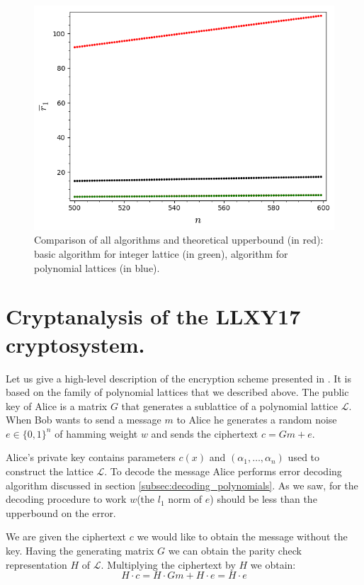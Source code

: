 \documentclass[12pt]{article}
\newcommand{\LL}{\mathcal{L}}
\begin{document}
\begin{figure}
  \includegraphics[width=\linewidth]{plot5.png}
  \caption{Comparison of all algorithms and theoretical upperbound (in red): basic algorithm for integer lattice (in green), algorithm for polynomial lattices (in blue).}
  \label{fig:everything}
\end{figure}

\section{Cryptanalysis of the LLXY17 cryptosystem.}
\label{sec:cryptanalysis}

Let us give a high-level description of the encryption scheme presented in \cite{[LLXY17]}. It is based on the family of polynomial lattices that we described above. The public key of Alice is a matrix $G$ that generates a sublattice of a polynomial lattice $\LL$. When Bob wants to send a message $m$ to Alice he generates a random noise $ e \in \{0,1\}^{n}$ of hamming weight $w$ and sends the ciphertext $c = Gm + e$.

Alice's private key contains parameters $c(x)$ and $(\alpha_1, \dots, \alpha_n)$ used to construct the lattice $\LL$. To decode the message Alice performs error decoding algorithm discussed in section \ref{subsec:decoding_polynomials}. As we saw, for the decoding procedure to work $w$(the $l_1$ norm of $e$) should be less than the upperbound on the error.

We are given the ciphertext $c$ we would like to obtain the message without the key. Having the generating matrix $G$ we can obtain the parity check representation $H$ of $\LL$. Multiplying the ciphertext by $H$ we obtain:
\[
    H \cdot c = H \cdot Gm + H \cdot e = H \cdot e
\]
\end{document}

